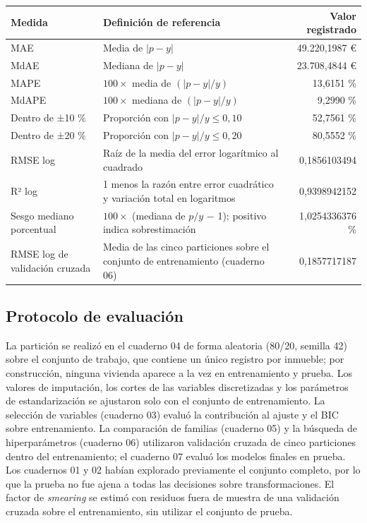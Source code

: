 \documentclass[11pt,a4paper]{article}
\newcommand{\thead}[1]{\textbf{#1}}
\newcounter{anexo}
\newcounter{anexosub}[anexo]
\begin{document}
\begin{center}
\footnotesize
\begin{tabularx}{\linewidth}{@{}l L r@{}}
\toprule
\thead{Medida} & \thead{Definición de referencia} & \thead{Valor registrado} \\
\midrule
MAE & Media de $|p - y|$ & 49.220,1987 € \\
MdAE & Mediana de $|p - y|$ & 23.708,4844 € \\
MAPE & $100 \times$ media de $(|p - y| / y)$ & 13,6151 \% \\
MdAPE & $100 \times$ mediana de $(|p - y| / y)$ & 9,2990 \% \\
Dentro de ±10 \% & Proporción con $|p - y| / y \le 0{,}10$ & 52,7561 \% \\
Dentro de ±20 \% & Proporción con $|p - y| / y \le 0{,}20$ & 80,5552 \% \\
RMSE log & Raíz de la media del error logarítmico al cuadrado & 0,1856103494 \\
R² log & 1 menos la razón entre error cuadrático y variación total en logaritmos & 0,9398942152 \\
Sesgo mediano porcentual & $100 \times$ (mediana de $p / y$ $-$ 1); positivo indica sobrestimación & 1,0254336376 \% \\
RMSE log de validación cruzada & Media de las cinco particiones sobre el conjunto de entrenamiento (cuaderno 06) & 0,1857717187 \\
\bottomrule
\end{tabularx}
\end{center}

%
\subsection*{\theanexo\hspace{0.3em}\hspace{0.45em}Protocolo de evaluación}

La partición se realizó en el cuaderno 04 de forma aleatoria (80/20, semilla 42) sobre el conjunto de trabajo, que contiene un único registro por inmueble; por construcción, ninguna vivienda aparece a la vez en entrenamiento y prueba. Los valores de imputación, los cortes de las variables discretizadas y los parámetros de estandarización se ajustaron solo con el conjunto de entrenamiento. La selección de variables (cuaderno 03) evaluó la contribución al ajuste y el BIC sobre entrenamiento. La comparación de familias (cuaderno 05) y la búsqueda de hiperparámetros (cuaderno 06) utilizaron validación cruzada de cinco particiones dentro del entrenamiento; el cuaderno 07 evaluó los modelos finales en prueba. Los cuadernos 01 y 02 habían explorado previamente el conjunto completo, por lo que la prueba no fue ajena a todas las decisiones sobre transformaciones. El factor de \emph{smearing} se estimó con residuos fuera de muestra de una validación cruzada sobre el entrenamiento, sin utilizar el conjunto de prueba.
\end{document}
